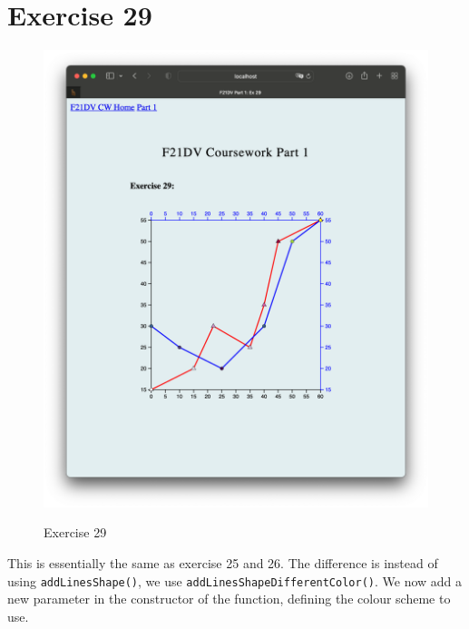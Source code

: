 \documentclass{scrreprt}
\begin{document}
\section{Exercise 29}
\begin{figure}[!ht]
    \centering
    \includegraphics[width = \textwidth]{images/ex29.png}
    \label{fig:ex29}
    \caption{Exercise 29}
\end{figure}
\FloatBarrier
% 
This is essentially the same as exercise 25 and 26. The difference is instead of using
\verb|addLinesShape()|, we use \verb|addLinesShapeDifferentColor()|. We now add a new parameter in the
constructor of the function, defining the colour scheme to use. 

\newpage
\end{document}
